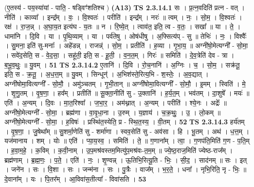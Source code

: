 \documentclass[17pt]{extarticle}
\begin{document}
                  \newline
                      (ए॒तस्य॑ - पय॒स्या॑यां - पाति॒ - षड्विꣳ॑शतिश्च )  \textbf{(A13)} \newline \newline
                                \textbf{ TS 2.3.14.1} \newline
                  सः । प्र॒त्न॒वदिति॑ प्रत्न - वत् । नीति॑ । काव्या᳚ । इन्द्र᳚म् । वः॒ । वि॒श्वतः॑ । परीति॑ । इन्द्र᳚म् । नरः॑ ॥ त्वम् । नः॒ । सो॒म॒ । वि॒श्वतः॑ । रक्ष॑ । रा॒ज॒न्न् । अ॒घा॒य॒त इत्य॑घ - य॒तः ॥ न । रि॒ष्ये॒त् । त्वाव॑त॒ इति॒ त्व - व॒तः॒ । सखा᳚ ॥ या । ते॒ । धामा॑नि । दि॒वि । या । पृ॒थि॒व्याम् । या । पर्व॑तेषु । ओष॑धीषु । अ॒फ्सित्य॑प् - सु ॥ तेभिः॑ । नः॒ । विश्वैः᳚ । सु॒मना॒ इति॑ सु-मनाः᳚ । अहे॑डन्न् । राजन्न्॑ । सो॒म॒ । प्रतीति॑ । ह॒व्या । गृ॒भा॒य॒ ॥ अग्नी॑षो॒मेत्यग्नी᳚ - सो॒मा॒ । सवे॑द॒सेति॒ स - वे॒द॒सा॒ । सहू॑ती॒ इति॒ स - हू॒ती॒ । व॒न॒त॒म् । गिरः॑ ॥ समिति॑ । दे॒व॒त्रेति॑ देव - त्रा । ब॒भू॒व॒थुः॒ ॥ यु॒वम् । \textbf{  51} \newline
                  \newline
                                \textbf{ TS 2.3.14.2} \newline
                  ए॒तानि॑ । दि॒वि । रो॒च॒नानि॑ । अ॒ग्निः । च॒ । सो॒म॒ । सक्र॑तू॒ इति॒ स - क्र॒तू॒ । अ॒ध॒त्त॒म् ॥ यु॒वम् । सिन्धून्॑ । अ॒भिश॑स्ते॒रित्य॒भि - श॒स्तेः॒ । अ॒व॒द्यात् । अग्नी॑षोमा॒वित्यग्नी᳚ - सो॒मौ॒ । अमु॑ञ्चतम् । गृ॒भी॒तान् ॥ अग्नी॑षोमा॒वित्यग्नी᳚ - सो॒मौ॒ । इ॒मम् । स्विति॑ । मे॒ । शृ॒णु॒तम् । वृ॒ष॒णा॒ । हव᳚म् । प्रतीति॑ ॥ सू॒क्ता॒नीति॑ सु - उ॒क्तानि॑ । ह॒र्य॒त॒म् । भव॑तम् । दा॒शुषे᳚ । मयः॑ ॥ एति॑ । अ॒न्यम् । दि॒वः । मा॒त॒रिश्वा᳚ । ज॒भा॒र॒ । अम॑थ्नात् । अ॒न्यम् । परीति॑ । श्ये॒नः । अद्रेः᳚ ॥ अग्नी॑षो॒मेत्यग्नी᳚ - सो॒मा॒ । ब्रह्म॑णा । वा॒वृ॒धा॒ना । उ॒रुम् । य॒ज्ञाय॑ । च॒क्र॒थुः॒ । उ॒ । लो॒कम् ॥ अग्नी॑षो॒मेत्यग्नी᳚ - सो॒मा॒ । ह॒विषः॑ । प्रस्थि॑त॒स्येति॒ प्र - स्थि॒त॒स्य॒ । वी॒तम् । \textbf{  52} \newline
                  \newline
                                \textbf{ TS 2.3.14.3} \newline
                  हर्य॑तम् । वृ॒ष॒णा॒ । जु॒षेथा᳚म् ॥ सु॒शर्मा॒णेति॑ सु - शर्मा॑णा । स्वव॒सेति॑ सु - अव॑सा । हि । भू॒तम् । अथ॑ । ध॒त्त॒म् । यज॑मानाय । शम् । योः ॥ एति॑ । प्या॒य॒स्व॒ । समिति॑ । ते॒ ॥ ग॒णाना᳚म् । त्वा॒ । ग॒णप॑ति॒मिति॑ ग॒ण - प॒ति॒म् । ह॒वा॒म॒हे॒ । क॒विम् । क॒वी॒नाम् । उ॒प॒मश्र॑वस्तम॒मित्यु॑प॒मश्र॑वः-त॒म॒म् ॥ ज्ये॒ष्ठ॒राज॒मिति॑ ज्येष्ठ-राज᳚म् । ब्रह्म॑णाम् । ब्र॒ह्म॒णः॒ । प॒ते॒ । एति॑ । नः॒ । शृ॒ण्वन्न् । ऊ॒तिभि॒रित्यू॒ति - भिः॒ । सी॒द॒ । साद॑नम् ॥ सः । इत् । जने॑न । सः । वि॒शा । सः । जन्म॑ना । सः । पु॒त्रैः । वाज᳚म् । भ॒र॒ते॒ । धना᳚ । नृभि॒रिति॒ नृ - भिः॒ ॥ दे॒वाना᳚म् । यः । पि॒तर᳚म् । आ॒विवा॑स॒तीत्या᳚ - विवा॑सति । \textbf{  53} \newline
\end{document}
